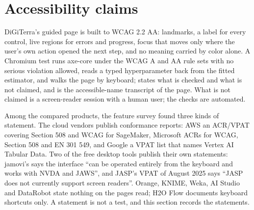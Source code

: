 \section{Accessibility claims}
\label{sec:access}

DiGiTerra's guided page is built to WCAG 2.2 AA: landmarks, a label for every control, live regions for errors and progress, focus that moves only where the user's own action opened the next step, and no meaning carried by color alone. A Chromium test runs axe-core under the WCAG A and AA rule sets with no serious violation allowed, reads a typed hyperparameter back from the fitted estimator, and walks the page by keyboard;  states what is checked and what is not claimed, and  is the accessible-name transcript of the page. What is not claimed is a screen-reader session with a human user; the checks are automated.

Among the compared products, the feature survey found three kinds of statement. The cloud vendors publish conformance reports: AWS an ACR/VPAT covering Section 508 and WCAG for SageMaker, Microsoft ACRs for WCAG, Section 508 and EN 301 549, and Google a VPAT list that names Vertex AI Tabular Data. Two of the free desktop tools publish their own statements: jamovi's says the interface ``can be operated entirely from the keyboard and works with NVDA and JAWS'', and JASP's VPAT of August 2025 says ``JASP does not currently support screen readers''. Orange, KNIME, Weka, AI Studio and DataRobot state nothing on the pages read; H2O Flow documents keyboard shortcuts only. A statement is not a test, and this section records the statements.
